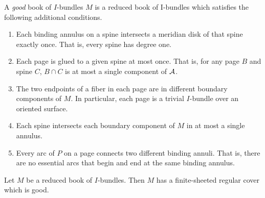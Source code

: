 \begin{defn}

A \emph{good} book of $I$-bundles $M$ is a reduced book of I-bundles which
satisfies the following additional conditions.

\begin{enumerate}

\item Each binding annulus on a spine intersects a meridian disk of that spine
exactly once. That is, every spine has degree one.

\item Each page is glued to a given spine at most once. That is, for any page
$B$ and spine $C$, $B \cap C$ is at most a single component of $\mathcal{A}$.

\item The two endpoints of a fiber in each page are in different boundary
components of $M$. In particular, each page is a trivial $I$-bundle over an
oriented surface.

\item Each spine intersects each boundary component of $M$ in at most a single
annulus.

\item Every arc of $P$ on a page connects two different binding annuli. That
is, there are no essential arcs that begin and end at the same binding annulus.

\end{enumerate}

\end{defn}

\begin{thm}

Let $M$ be a reduced book of $I$-bundles. Then $M$ has a finite-sheeted regular
cover which is good.

\end{thm}

